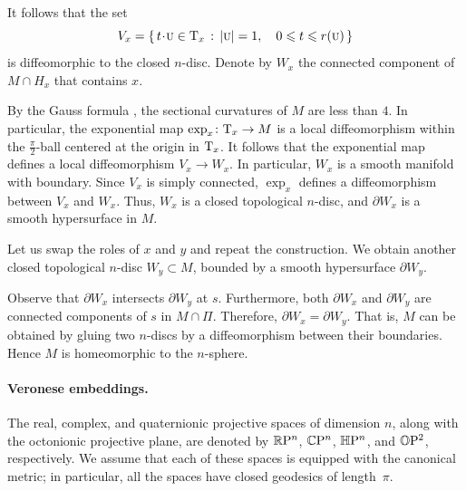 \documentclass[a4paper,10pt]{article}
\begin{document}
It follows that the set
\[
V_x = \set{t \cdot \mathsc{u} \in \T_x}{|\mathsc{u}| = 1, \quad 0 \leqslant t \leqslant r(\mathsc{u})}
\]
is diffeomorphic to the closed \(n\)-disc.
Denote by \(W_x\) the connected component of \(M \cap H_x\) that contains \(x\).

By the Gauss formula \cite[Lemma 5]{petrunin2024}, the sectional curvatures of \(M\) are less than \(4\).
In particular, the exponential map \(\exp_x \colon \mathrm{T}_x \to M\) is a local diffeomorphism within the \(\tfrac{\pi}{2}\)-ball centered at the origin in \(\mathrm{T}_x\).
It follows that the exponential map defines a local diffeomorphism $V_x \to W_x$.
In particular, $W_x$ is a smooth manifold with boundary.
Since $V_x$ is simply connected, $\exp_x$ defines a diffeomorphism between $V_x$ and $W_x$.
Thus, $W_x$ is a closed topological $n$-disc, and $\partial W_x$ is a smooth hypersurface in $M$.

Let us swap the roles of \(x\) and \(y\) and repeat the construction.
We obtain another closed topological \(n\)-disc \(W_y \subset M\), bounded by a smooth hypersurface \(\partial W_y\).

Observe that $\partial W_x$ intersects $\partial W_y$ at $s$.
Furthermore, both $\partial W_x$ and $\partial W_y$ are connected components of $s$ in $M\cap \Pi$.
Therefore, $\partial W_x=\partial W_y$.
That is, $M$ can be obtained by gluing two $n$-discs by a diffeomorphism between their boundaries.
Hence $M$ is homeomorphic to the $n$-sphere.
\qeds

\paragraph{Veronese embeddings.}\label{veronese}
The real, complex, and quaternionic projective spaces of dimension \(n\), along with the octonionic projective plane, are denoted by \(\mathbb{R}\mathrm{P}^n\), \(\mathbb{C}\mathrm{P}^n\), \(\mathbb{H}\mathrm{P}^n\), and \(\mathbb{O}\mathrm{P}^2\), respectively.
We assume that each of these spaces is equipped with the canonical metric; in particular, all the spaces have closed geodesics of length~\(\pi\).
\end{document}
